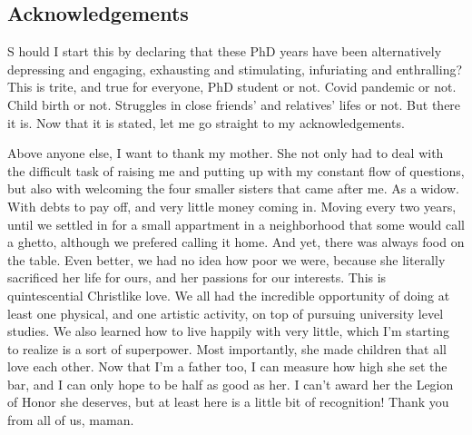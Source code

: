 
{}

\vspace*{-1.6cm}
\begin{flushright}
\section*{\fontsize{20pt}{20pt}\selectfont\textnormal{Acknowledgements}}
\end{flushright}
\vspace{-0.2cm}


\chead[\fancyplain{}{}]
      {\fancyplain{}{}}
\lfoot[\fancyplain{}{}]
      {\fancyplain{}{}}
\cfoot[\fancyplain{}{\thepage}]
      {\fancyplain{}{\thepage}}
\rfoot[\fancyplain{}{}]%
     {\fancyplain{}{\scriptsize}}


\lettrine[lines=1]{S}{ } hould I start this by declaring that these PhD years have been alternatively depressing and engaging, exhausting and stimulating, infuriating and enthralling? This is trite, and true for everyone, PhD student or not. Covid pandemic or not. Child birth or not. Struggles in close friends' and relatives' lifes or not. But there it is. Now that it is stated, let me go straight to my acknowledgements.

Above anyone else, I want to thank my mother. She not only had to deal with the difficult task of raising me and putting up with my constant flow of questions, but also with welcoming the four smaller sisters that came after me. As a widow. With debts to pay off, and very little money coming in. Moving every two years, until we settled in for a small appartment in a neighborhood that some would call a ghetto, although we prefered calling it home. And yet, there was always food on the table. Even better, we had no idea how poor we were, because she literally sacrificed her life for ours, and her passions for our interests. This is quintescential Christlike love. We all had the incredible opportunity of doing at least one physical, and one artistic activity, on top of pursuing university level studies. We also learned how to live happily with very little, which I'm starting to realize is a sort of superpower. Most importantly, she made children that all love each other. Now that I'm a father too, I can measure how high she set the bar, and I can only hope to be half as good as her. I can't award her the Legion of Honor she deserves, but at least here is a little bit of recognition! Thank you from all of us, maman.

